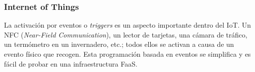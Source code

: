 \subsubsection{Internet of Things}

La activación por eventos o \emph{triggers} es un aspecto importante dentro del IoT. Un NFC (\emph{Near-Field Communication}), un lector de tarjetas, una cámara de tráfico, un termómetro en un invernadero, etc.; todos ellos se activan a causa de un evento físico que recogen. Esta programación basada en eventos se simplifica y es fácil de probar en una infraestructura FaaS.
